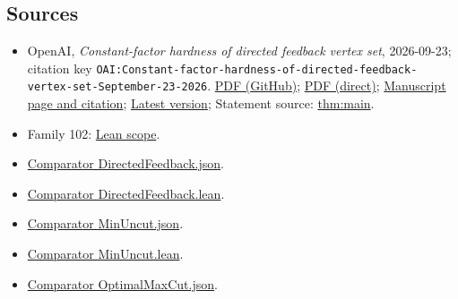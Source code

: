 \documentclass[11pt]{article}
\begin{document}
\subsection{Sources}
\begin{itemize}
\item OpenAI, \emph{Constant-factor hardness of directed feedback vertex set}, 2026-09-23; citation key \texttt{OAI:Constant-factor-hardness-of-directed-feedback-vertex-set-September-23-2026}. \href{https://github.com/openai/math/blob/adc7f1241b42e322a6451854ab7e4b4c146bf78a/preprints/Constant-factor-hardness-of-directed-feedback-vertex-set-September-23-2026/paper.pdf}{PDF (GitHub)}; \href{https://github.com/openai/math/raw/adc7f1241b42e322a6451854ab7e4b4c146bf78a/preprints/Constant-factor-hardness-of-directed-feedback-vertex-set-September-23-2026/paper.pdf}{PDF (direct)}; \href{https://github.com/openai/math/blob/adc7f1241b42e322a6451854ab7e4b4c146bf78a/preprints/Constant-factor-hardness-of-directed-feedback-vertex-set-September-23-2026/README.md}{Manuscript page and citation}; \href{https://github.com/openai/math/blob/main/preprints/Constant-factor-hardness-of-directed-feedback-vertex-set-September-23-2026/paper.pdf}{Latest version}; Statement source: \href{https://github.com/openai/math/blob/adc7f1241b42e322a6451854ab7e4b4c146bf78a/preprints/Constant-factor-hardness-of-directed-feedback-vertex-set-September-23-2026/build/sections/introduction.tex\#L50}{thm:main}.
\item Family 102: \href{https://github.com/openai/math/blob/adc7f1241b42e322a6451854ab7e4b4c146bf78a/lean/docs/102.md}{Lean scope}.
\item \href{https://github.com/openai/math/blob/adc7f1241b42e322a6451854ab7e4b4c146bf78a/lean/ComparatorChallenges/DirectedFeedback.json}{Comparator DirectedFeedback.json}.
\item \href{https://github.com/openai/math/blob/adc7f1241b42e322a6451854ab7e4b4c146bf78a/lean/ComparatorChallenges/DirectedFeedback.lean}{Comparator DirectedFeedback.lean}.
\item \href{https://github.com/openai/math/blob/adc7f1241b42e322a6451854ab7e4b4c146bf78a/lean/ComparatorChallenges/MinUncut.json}{Comparator MinUncut.json}.
\item \href{https://github.com/openai/math/blob/adc7f1241b42e322a6451854ab7e4b4c146bf78a/lean/ComparatorChallenges/MinUncut.lean}{Comparator MinUncut.lean}.
\item \href{https://github.com/openai/math/blob/adc7f1241b42e322a6451854ab7e4b4c146bf78a/lean/ComparatorChallenges/OptimalMaxCut.json}{Comparator OptimalMaxCut.json}.

\end{itemize}
\end{document}
